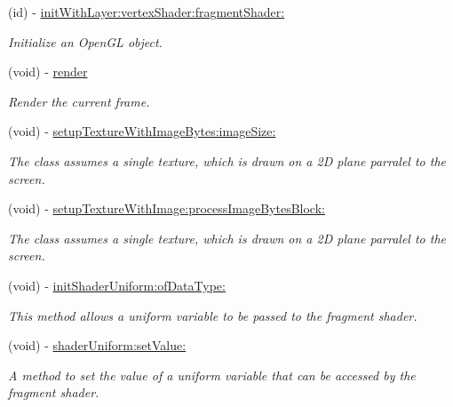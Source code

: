 \begin{DoxyCompactItemize}
\item 
(id) -\/ \hyperlink{interface_r_r_open_g_l_a28b3ad4fa31ec4a4175bb3dc89b71db3}{init\-With\-Layer\-:vertex\-Shader\-:fragment\-Shader\-:}
\begin{DoxyCompactList}\small\item\em Initialize an Open\-G\-L object. \end{DoxyCompactList}\item 
(void) -\/ \hyperlink{interface_r_r_open_g_l_a946656991c6afc711527622321ba290d}{render}
\begin{DoxyCompactList}\small\item\em Render the current frame. \end{DoxyCompactList}\item 
(void) -\/ \hyperlink{interface_r_r_open_g_l_aece4b95562f455788886ec98d85e7078}{setup\-Texture\-With\-Image\-Bytes\-:image\-Size\-:}
\begin{DoxyCompactList}\small\item\em The class assumes a single texture, which is drawn on a 2\-D plane parralel to the screen. \end{DoxyCompactList}\item 
(void) -\/ \hyperlink{interface_r_r_open_g_l_a80c8099fdb52ef67650e7b3f55ebecee}{setup\-Texture\-With\-Image\-:process\-Image\-Bytes\-Block\-:}
\begin{DoxyCompactList}\small\item\em The class assumes a single texture, which is drawn on a 2\-D plane parralel to the screen. \end{DoxyCompactList}\item 
(void) -\/ \hyperlink{interface_r_r_open_g_l_afc9f8505583fd382237d1a2c3b5d70c7}{init\-Shader\-Uniform\-:of\-Data\-Type\-:}
\begin{DoxyCompactList}\small\item\em This method allows a uniform variable to be passed to the fragment shader. \end{DoxyCompactList}\item 
(void) -\/ \hyperlink{interface_r_r_open_g_l_a49542e5ad391645248c2a89cd03b4dfe}{shader\-Uniform\-:set\-Value\-:}
\begin{DoxyCompactList}\small\item\em A method to set the value of a uniform variable that can be accessed by the fragment shader. \end{DoxyCompactList}\end{DoxyCompactItemize}


